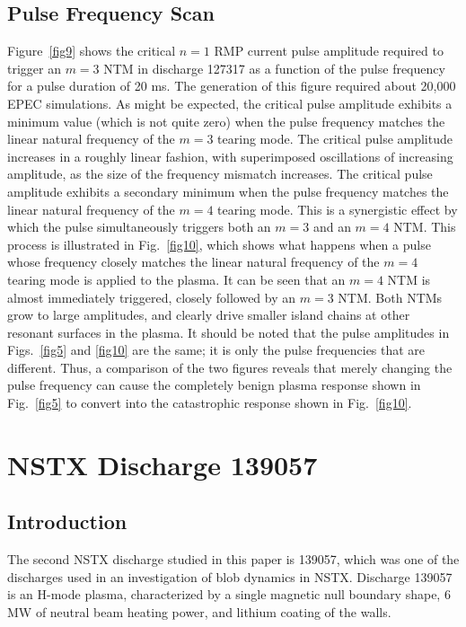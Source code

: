 \documentclass[12pt,prb,aps]{revtex4-1}
\begin{document}
\subsection{Pulse Frequency Scan}
Figure~\ref{fig9} shows the critical $n=1$ RMP current  pulse amplitude required to trigger an $m=3$ NTM in discharge 127317 as a
function of the pulse frequency for a pulse duration of 20 ms. The generation of this figure required about 20,000 EPEC
simulations.  As might be expected, the critical pulse amplitude exhibits a minimum value (which is not quite zero) when
the pulse frequency matches the linear natural frequency of the $m=3$ tearing mode. The critical pulse amplitude
increases in a roughly linear fashion, with superimposed oscillations of increasing amplitude, as the size of the frequency mismatch increases. The critical pulse amplitude  exhibits a secondary minimum when the pulse frequency matches the
linear natural frequency of the $m=4$ tearing mode. This is a synergistic effect by which the pulse simultaneously triggers 
both an $m=3$ and an $m=4$ NTM. This process is illustrated in Fig.~\ref{fig10}, which shows what happens when
a pulse whose frequency closely matches the
linear natural frequency of the $m=4$ tearing mode is applied to the plasma. It can be seen that an $m=4$
NTM is almost immediately triggered, closely followed by an $m=3$ NTM. Both NTMs grow to large amplitudes, and
clearly drive smaller island chains at other resonant surfaces in the plasma. It should be noted that the pulse amplitudes
in Figs.~\ref{fig5} and \ref{fig10} are the same; it is only the pulse frequencies that are different. Thus,  a
comparison of the two figures reveals that merely changing the pulse frequency can cause the completely benign plasma response
shown in Fig.~\ref{fig5} to convert into the catastrophic response shown in Fig.~\ref{fig10}. 

\section{NSTX Discharge 139057}

\subsection{Introduction}
The second NSTX discharge  studied in this paper is 139057, which was one of the discharges used in an investigation of blob dynamics in NSTX.\cite{nstx1} Discharge 139057 is an H-mode plasma, characterized by a single magnetic null boundary shape,  6 MW of neutral
beam heating power, and  lithium coating of the walls. 
\end{document}

